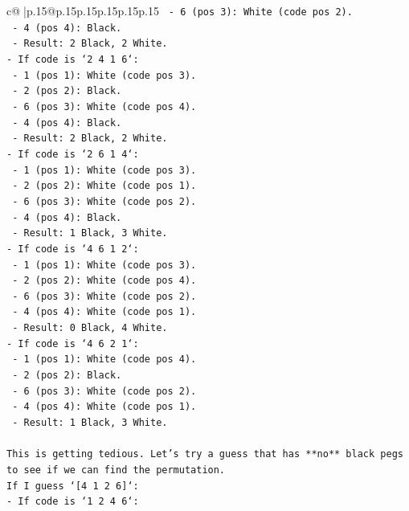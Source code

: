 \documentclass{article}
\begin{document}
{\begin{supertabular}{c@{$\;$}|p{.15\linewidth}@{}p{.15\linewidth}p{.15\linewidth}p{.15\linewidth}p{.15\linewidth}p{.15\linewidth}}
{{{\texttt{  {-} 6 (pos 3): White (code pos 2).} \\
\texttt{  {-} 4 (pos 4): Black.} \\
\texttt{  {-} Result: 2 Black, 2 White.} \\
\texttt{{-} If code is `2 4 1 6`:} \\
\texttt{  {-} 1 (pos 1): White (code pos 3).} \\
\texttt{  {-} 2 (pos 2): Black.} \\
\texttt{  {-} 6 (pos 3): White (code pos 4).} \\
\texttt{  {-} 4 (pos 4): Black.} \\
\texttt{  {-} Result: 2 Black, 2 White.} \\
\texttt{{-} If code is `2 6 1 4`:} \\
\texttt{  {-} 1 (pos 1): White (code pos 3).} \\
\texttt{  {-} 2 (pos 2): White (code pos 1).} \\
\texttt{  {-} 6 (pos 3): White (code pos 2).} \\
\texttt{  {-} 4 (pos 4): Black.} \\
\texttt{  {-} Result: 1 Black, 3 White.} \\
\texttt{{-} If code is `4 6 1 2`:} \\
\texttt{  {-} 1 (pos 1): White (code pos 3).} \\
\texttt{  {-} 2 (pos 2): White (code pos 4).} \\
\texttt{  {-} 6 (pos 3): White (code pos 2).} \\
\texttt{  {-} 4 (pos 4): White (code pos 1).} \\
\texttt{  {-} Result: 0 Black, 4 White.} \\
\texttt{{-} If code is `4 6 2 1`:} \\
\texttt{  {-} 1 (pos 1): White (code pos 4).} \\
\texttt{  {-} 2 (pos 2): Black.} \\
\texttt{  {-} 6 (pos 3): White (code pos 2).} \\
\texttt{  {-} 4 (pos 4): White (code pos 1).} \\
\texttt{  {-} Result: 1 Black, 3 White.} \\
\\ 
\texttt{This is getting tedious. Let's try a guess that has **no** black pegs to see if we can find the permutation.} \\
\texttt{If I guess `{[}4 1 2 6{]}`:} \\
\texttt{{-} If code is `1 2 4 6`:} \\
}}}
\end{supertabular}}
\end{document}
